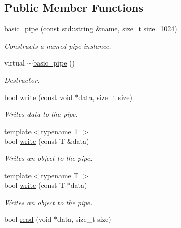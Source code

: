 \subsection*{Public Member Functions}
\begin{DoxyCompactItemize}
\item 
\hyperlink{classcpen333_1_1process_1_1basic__pipe_af61543ec6433ad27cac0433a138199b7}{basic\+\_\+pipe} (const std\+::string \&name, size\+\_\+t size=1024)
\begin{DoxyCompactList}\small\item\em Constructs a named pipe instance. \end{DoxyCompactList}\item 
\mbox{\label{classcpen333_1_1process_1_1basic__pipe_a2b449884a292300321fc2cb9b5fb6500}} 
virtual \hyperlink{classcpen333_1_1process_1_1basic__pipe_a2b449884a292300321fc2cb9b5fb6500}{$\sim$basic\+\_\+pipe} ()
\begin{DoxyCompactList}\small\item\em Destructor. \end{DoxyCompactList}\item 
bool \hyperlink{classcpen333_1_1process_1_1basic__pipe_a969c7f9d0069b13e8fd3c50d98cb94a5}{write} (const void $\ast$data, size\+\_\+t size)
\begin{DoxyCompactList}\small\item\em Writes data to the pipe. \end{DoxyCompactList}\item 
{\footnotesize template$<$typename T $>$ }\\bool \hyperlink{classcpen333_1_1process_1_1basic__pipe_a41084217cb3913a8db572b012c2a0ea5}{write} (const T \&data)
\begin{DoxyCompactList}\small\item\em Writes an object to the pipe. \end{DoxyCompactList}\item 
{\footnotesize template$<$typename T $>$ }\\bool \hyperlink{classcpen333_1_1process_1_1basic__pipe_a31a394d2126fdcf8cfaace1733f941ff}{write} (const T $\ast$data)
\begin{DoxyCompactList}\small\item\em Writes an object to the pipe. \end{DoxyCompactList}\item 
bool \hyperlink{classcpen333_1_1process_1_1basic__pipe_a4176320551b61bec3c52d77c6a9a75d2}{read} (void $\ast$data, size\+\_\+t size)

\end{DoxyCompactItemize}
